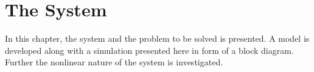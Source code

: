 \chapter{The System}
In this chapter, the system and the problem to be solved is presented. A model is developed along with a simulation presented here in form of a block diagram. Further the nonlinear nature of the system is investigated.